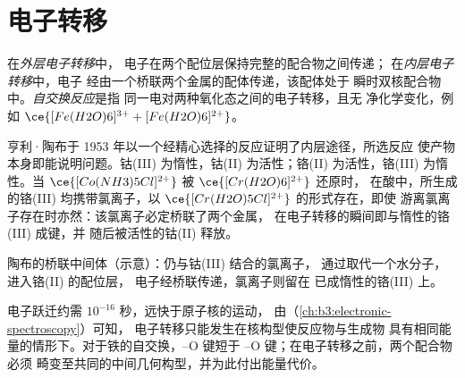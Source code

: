 \section{电子转移}

\begin{definition}[外层与内层电子转移]\label{def:b3:complex-mechanisms:electron-transfer}
在\emph{外层电子转移}中，
电子在两个配位层保持完整的配合物之间传递；
在\emph{内层电子转移}中，电子
经由一个桥联两个金属的配体传递，该配体处于
瞬时双核配合物中。\emph{自交换反应}是指
同一电对两种氧化态之间的电子转移，且无
净化学变化，例如 $\ce{[Fe(H2O)6]^{3+} + [Fe(H2O)6]^{2+}}$。
\end{definition}

亨利·陶布于 1953 年以一个经精心选择的反应证明了内层途径，所选反应
使产物本身即能说明问题。钴(III) 为惰性，钴(II) 为活性；铬(II)
为活性，铬(III) 为惰性。当 $\ce{[Co(NH3)5Cl]^{2+}}$ 被 $\ce{[Cr(H2O)6]^{2+}}$ 还原时，
在酸中，所生成的铬(III) 均携带氯离子，以 $\ce{[Cr(H2O)5Cl]^{2+}}$ 的形式存在，即使
游离氯离子存在时亦然：该氯离子必定桥联了两个金属，
在电子转移的瞬间即与惰性的铬(III) 成键，并
随后被活性的钴(II) 释放。

\begin{omfigure}

{\small 陶布的桥联中间体（示意）：仍与钴(III) 结合的氯离子，
通过取代一个水分子，进入铬(II) 的配位层，
电子经桥联传递，氯离子则留在
已成惰性的铬(III) 上。}
\end{omfigure}

电子跃迁约需 $10^{-16}$ 秒，远快于原子核的运动，
由（\cref{ch:b3:electronic-spectroscopy}）可知，
电子转移只能发生在核构型使反应物与生成物
具有相同能量的情形下。对于铁的自交换，--O 键短于
--O 键；在电子转移之前，两个配合物必须
畸变至共同的中间几何构型，并为此付出能量代价。

